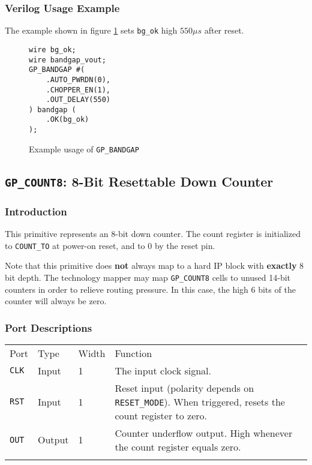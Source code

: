\documentclass[11pt]{article}
\renewcommand\emph\textbf
\newcommand{\tokenstyle}[1]{\texttt{#1}}
\newcommand{\wirestyle}[1]{\texttt{#1}}
\newcommand{\whenstyle}[1]{{\fontseries{sb}\selectfont#1}}
\newcommand{\thinhline}{\Xhline{1\arrayrulewidth}}
\newcommand{\thickhline}{\Xhline{2.5\arrayrulewidth}}
\begin{document}
\subsubsection{Verilog Usage Example}

The example shown in figure \ref{gp-bandgap-example} sets \wirestyle{bg\_ok} high $550 \mu s$ after reset.

\begin{figure}[h]
\begin{lstlisting}
wire bg_ok;
wire bandgap_vout;
GP_BANDGAP #(
	.AUTO_PWRDN(0),
	.CHOPPER_EN(1),
	.OUT_DELAY(550)
) bandgap (
	.OK(bg_ok)
);
\end{lstlisting}
\caption{Example usage of \tokenstyle{GP\_BANDGAP}}
\label{gp-bandgap-example}
\end{figure}


\pagebreak
\subsection{\tokenstyle{GP\_COUNT8}: 8-Bit Resettable Down Counter}
\label{gp-count8}

\subsubsection{Introduction}
This primitive represents an 8-bit down counter. The count register is initialized to \tokenstyle{COUNT\_TO} at
power-on reset, and to 0 by the reset pin.

Note that this primitive does \emph{not} always map to a hard IP block with \emph{exactly} 8 bit depth. The technology
mapper may map \tokenstyle{GP\_COUNT8} cells to unused 14-bit counters in order to relieve routing pressure.
In this case, the high 6 bits of the counter will always be zero.

\subsubsection{Port Descriptions}

\begin{tabularx}{\textwidth}{lllX}
\thinhline
\whenstyle{Port} & \whenstyle{Type} & \whenstyle{Width} & \whenstyle{Function} \\
\thickhline
\tokenstyle{CLK} & Input & 1 & The input clock signal. \\
\thinhline
\tokenstyle{RST} & Input & 1 & Reset input (polarity depends on \tokenstyle{RESET\_MODE}).
	When triggered, resets the count register to zero. \\
\thinhline
\tokenstyle{OUT} & Output & 1 & Counter underflow output. High whenever the count register equals zero. \\
\thinhline
\end{tabularx}
\end{document}
